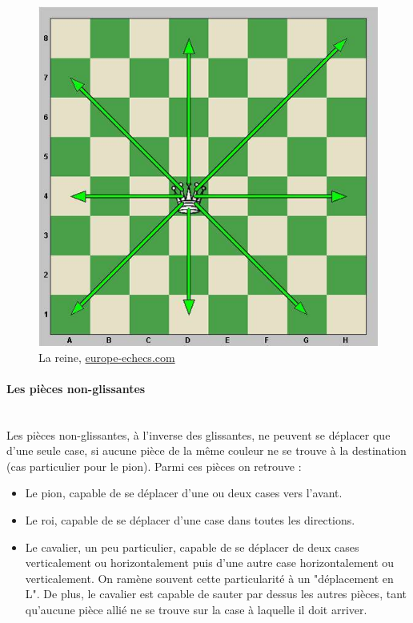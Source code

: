 \huge\documentclass{article}
\begin{document}
\newpage

\begin{figure}[h]
\centering
\includegraphics[scale=0.5]{img/mouvements_reine.jpg}
\caption{La reine,
\href{https://www.europe-echecs.com/art/2-le-deplacement-des-pieces-93.html}{europe-echecs.com}}
\end{figure}

\paragraph{Les pièces non-glissantes}
~~\\
Les pièces non-glissantes, à l'inverse des glissantes, ne peuvent se déplacer que d'une seule case, si aucune pièce de la même couleur ne se trouve à la destination (cas particulier pour le pion). Parmi ces pièces on retrouve :

\begin{itemize}
    \item Le pion, capable de se déplacer d'une ou deux cases vers l'avant.
    \item Le roi, capable de se déplacer d'une case dans toutes les directions.
    \item Le cavalier, un peu particulier, capable de se déplacer de deux cases verticalement ou horizontalement puis d'une autre case horizontalement ou verticalement. On ramène souvent cette particularité à un "déplacement en L". De plus, le cavalier est capable de sauter par dessus les autres pièces, tant qu'aucune pièce allié ne se trouve sur la case à laquelle il doit arriver.
\end{itemize}
\end{document}
